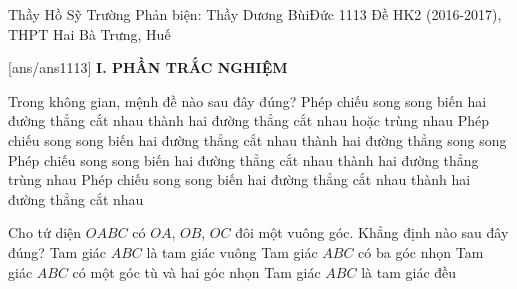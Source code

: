 \begin{name}
{Thầy Hồ Sỹ Trường \newline Phản biện: Thầy Dương BùiĐức}
{1113 Đề HK2 (2016-2017), THPT Hai Bà Trưng, Huế}
	\end{name}
	\setcounter{ex}{0}\setcounter{bt}{0}
	[ans/ans1113]
\noindent\textbf{I. PHẦN TRẮC NGHIỆM}
\begin{ex}%
    Trong không gian, mệnh đề nào sau đây đúng?
    \choice
    {\True Phép chiếu song song biến hai đường thẳng cắt nhau thành hai đường thẳng cắt nhau hoặc trùng nhau}
    {Phép chiếu song song biến hai đường thẳng cắt nhau thành hai đường thẳng song song}
    {Phép chiếu song song biến hai đường thẳng cắt nhau thành hai đường thẳng trùng nhau}
    {Phép chiếu song song biến hai đường thẳng cắt nhau thành hai đường thẳng cắt nhau}
\end{ex}
\begin{ex}%
    Cho tứ diện $OABC$ có $OA$, $OB$, $OC$ đôi một vuông góc. Khẳng định nào sau đây đúng?
    \choice
    {Tam giác $ABC$ là tam giác vuông}
    {\True Tam giác $ABC$ có ba góc nhọn}
    {Tam giác $ABC$ có một góc tù và hai góc nhọn}
    {Tam giác $ABC$ là tam giác đều}
\end{ex}
